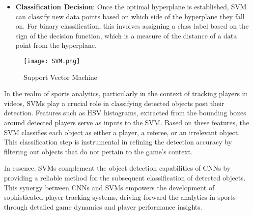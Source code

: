 \documentclass[12pt, letterpaper]{article}
\begin{document}
{\begin{spacing}{1.2}
\begin{itemize}
    \item \textbf{Classification Decision}: Once the optimal hyperplane is established, SVM can classify new data points based on which side of the hyperplane they fall on. For binary classification, this involves assigning a class label based on the sign of the decision function, which is a measure of the distance of a data point from the hyperplane.
\end{itemize}

\begin{figure}[htbp]
\centering
\texttt{[image: SVM.png]}
\captionsetup{font=large}
\caption{Support Vector Machine}
\label{fig:SVM}
\end{figure}

In the realm of sports analytics, particularly in the context of tracking players in videos, SVMs play a crucial role in classifying detected objects post their detection. Features such as HSV histograms, extracted from the bounding boxes around detected players serve as inputs to the SVM. Based on these features, the SVM classifies each object as either a player, a referee, or an irrelevant object. This classification step is instrumental in refining the detection accuracy by filtering out objects that do not pertain to the game's context.

In essence, SVMs complement the object detection capabilities of CNNs by providing a reliable method for the subsequent classification of detected objects. This synergy between CNNs and SVMs empowers the development of sophisticated player tracking systems, driving forward the analytics in sports through detailed game dynamics and player performance insights.

\end{spacing}
}
\end{document}
